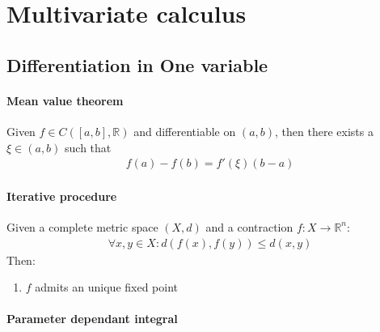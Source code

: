\newpage
\section{Multivariate calculus}
\subsection{Differentiation in One variable}
\paragraph{Mean value theorem}
\begin{theorem}
	Given $f \in C([a, b], \mathbb{R})$ and differentiable on $(a, b)$, then there exists a $\xi \in (a, b)$ such that
	\begin{align*}
		f(a) - f(b) = f'(\xi) (b - a)
	\end{align*}
\end{theorem}

\paragraph{Iterative procedure}
\begin{theorem}
	Given a complete metric space $(X, d)$ and a contraction $f:X \rightarrow \mathbb{R}^n $:
	\begin{align*}
		\forall x, y \in X: d(f(x), f(y)) \leq d(x, y)
	\end{align*}
	Then:
	\begin{enumerate}
		\item $f$ admits an unique fixed point
	\end{enumerate}
\end{theorem}

\paragraph{Parameter dependant integral}
\begin{theorem}
\end{theorem}


